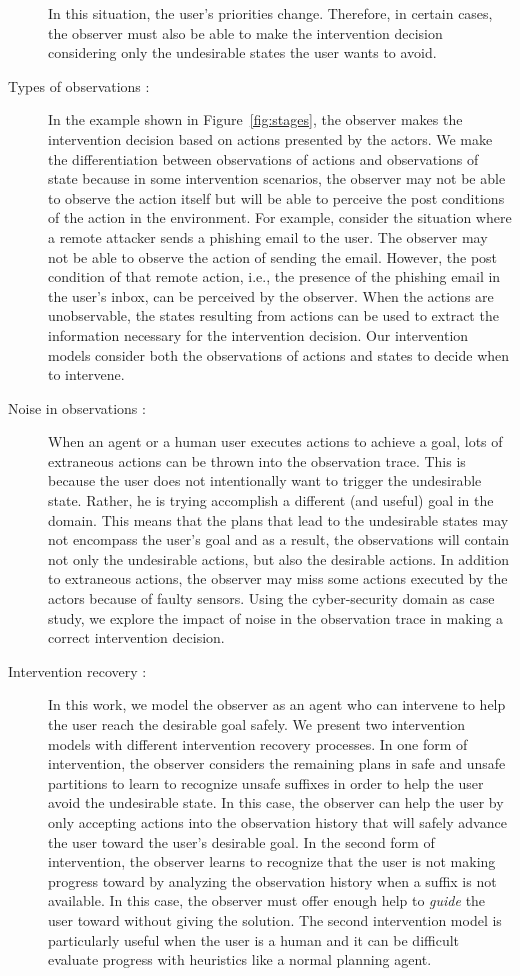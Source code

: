 \begin{description}
In this situation, the user's priorities change.
Therefore, in certain cases, the observer must also be able to make the intervention decision considering only the undesirable states the user wants to avoid.
\item [Types of observations :] In the example shown in Figure~\ref{fig:stages}, the observer makes the intervention decision based on actions presented by the actors. 
We make the differentiation between observations of actions and observations of state because in some intervention scenarios, the observer may not be able to observe the action itself but will be able to perceive the post conditions of the action in the environment. 
For example, consider the situation where a remote attacker sends a phishing email to the user. The observer may not be able to observe the action of sending the email.
However, the post condition of that remote action, i.e., the presence of the phishing email in the user's inbox, can be perceived by the observer.
When the actions are unobservable, the states resulting from actions can be used to extract the information necessary for the intervention decision.
Our intervention models consider both the observations of actions and states to decide when to intervene.
\item [Noise in observations :] When an agent or a human user executes actions to achieve a goal, lots of extraneous actions can be thrown into the observation trace. 
This is because the user does not intentionally want to trigger the undesirable state. Rather, he is trying accomplish a different (and useful) goal in the domain. 
This means that the plans that lead to the undesirable states may not encompass the user's goal and as a result, the observations will contain not only the undesirable actions, but also the desirable actions.
In addition to extraneous actions, the observer may miss some actions executed by the actors because of faulty sensors. 
Using the cyber-security domain as case study, we explore the impact of noise in the observation trace in making a correct intervention decision.
\item [Intervention recovery :] In this work, we model the observer as an agent who can intervene to help the user reach the desirable goal safely. We present two intervention models with different intervention recovery processes.
In one form of intervention, the observer considers the remaining plans in safe and unsafe partitions to learn to recognize unsafe suffixes in order to help the user avoid the undesirable state.
In this case, the observer can help the user by only accepting actions into the observation history that will safely advance the user toward the user's desirable goal.
In the second form of intervention, the observer learns to recognize that the user is not making progress toward \desired by analyzing the observation history when a suffix is not available. In this case,  the observer must offer enough help to \textit{guide} the user toward \desired without giving the solution. 
The second intervention model is particularly useful when the user is a human and it can be difficult evaluate progress with heuristics like a normal planning agent.
\end{description}


